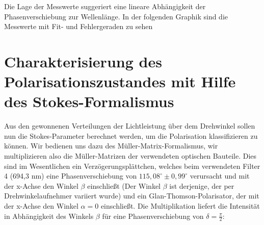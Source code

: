 \documentclass[bigchapter,colorback,accentcolor=tud4b,linedtoc,11pt]{tudreport}
\begin{document}
Die Lage der Messwerte suggeriert eine lineare Abhängigkeit der Phasenverschiebung zur Wellenlänge. In der folgenden Graphik sind die Messwerte mit Fit- und Fehlergeraden zu sehen

\begin{center}
\begin{figure}[h]
\end{figure}
\end{center}
\FloatBarrier

\section{Charakterisierung des Polarisationszustandes mit Hilfe des Stokes-Formalismus}

Aus den gewonnenen Verteilungen der Lichtleistung über dem Drehwinkel sollen nun die Stokes-Parameter berechnet werden, um die Polarisation klassifizieren zu können. Wir bedienen uns dazu des Müller-Matrix-Formalismus, wir multiplizieren also die Müller-Matrizen der verwendeten optischen Bauteile. Dies sind im Wesentlichen ein Verzögerungsplättchen, welches beim verwendeten Filter 4 (694,3 nm) eine Phasenverschiebung von $115,08^\circ \pm 0,99^\circ$ verursacht und mit der x-Achse den Winkel $\beta$ einschließt (Der Winkel $\beta$ ist derjenige, der per Drehwinkelaufnehmer variiert wurde) und ein Glan-Thomson-Polarisator, der mit der x-Achse den Winkel $\alpha = 0$ einschließt. Die Multiplikation liefert die Intensität in Abhängigkeit des Winkels $\beta$ für eine Phasenverschiebung von $\delta=\frac{\pi}{2}$: 
\end{document}
